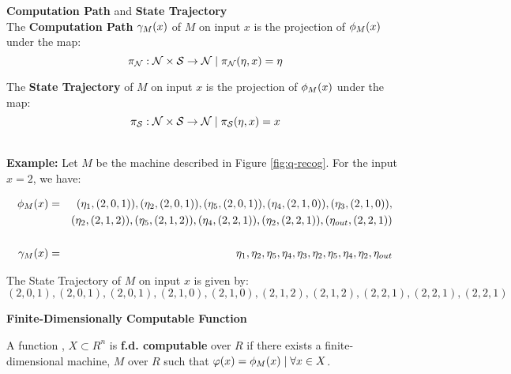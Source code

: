\begin{definition}{\textbf{Computation Path} and \textbf{State Trajectory}}\\
  
  The \textbf{Computation Path} $\gamma_M(x)$ of $M$ on
  input $x$ is the projection of $\phi_M(x)$ under the map:
  $$\pi_{\mathcal{N}}:\mathcal{N} \times \mathcal{S} \rightarrow \mathcal{N} \mid \pi_{\mathcal{N}}(\eta, x) = \eta$$
  
  The \textbf{State Trajectory} of $M$ on input $x$ is the projection
  of $\phi_M(x)$ under the map:
  $$\pi_{\mathcal{S}}:\mathcal{N} \times \mathcal{S} \rightarrow \mathcal{N} \mid \pi_{\mathcal{S}}(\eta, x) = x$$
\end{definition}

\\

\textbf{Example: } Let $M$ be the machine described in Figure
\ref{fig:q-recog}. For the input $x = 2$, we have:

\begin{eqnarray*}
  \phi_M(x) &=& (\eta_1, (2,0,1)), (\eta_2, (2,0,1)), (\eta_5, (2,0,1)), (\eta_4, (2,1,0)), (\eta_3, (2,1,0)),\\
            &&  (\eta_2, (2,1,2)), (\eta_5, (2,1,2)), (\eta_4, (2,2,1)), (\eta_2, (2,2,1)), (\eta_{out}, (2,2,1))\\
            && \\
  \gamma_M(x) &=& \eta_1, \eta_2, \eta_5, \eta_4, \eta_3, \eta_2, \eta_5, \eta_4, \eta_2, \eta_{out}
\end{eqnarray*}

The State Trajectory of $M$ on input $x$ is given by:
$$(2,0,1), (2,0,1), (2,0,1), (2,1,0), (2,1,0), (2,1,2), (2,1,2), (2,2,1), (2,2,1), (2,2,1)$$


\begin{definition}{\textbf{Finite-Dimensionally Computable Function}}
  
  A function , $X \subset R^n$ is
  \textbf{f.d. computable} over $R$ if there exists a
  finite-dimensional machine, $M$ over $R$ such that 
  $\varphi(x) = \phi_M(x) \mid \forall x \in X$.
  
\end{definition}

